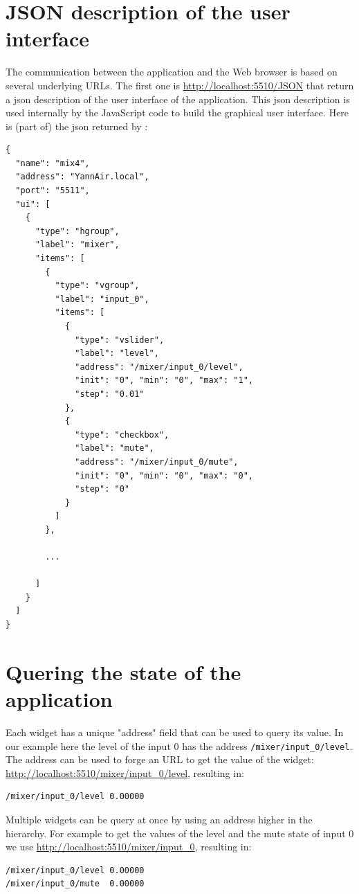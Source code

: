 \section{JSON description of the user interface}
The communication between the application and the Web browser is based on several underlying URLs. The first one is \url{http://localhost:5510/JSON} that return a json description of the user interface of the application. This json description is used internally by the JavaScript code to build the graphical user interface. Here is (part of) the json returned by :
\begin{lstlisting}
{
  "name": "mix4",
  "address": "YannAir.local",
  "port": "5511",
  "ui": [
    {
      "type": "hgroup",
      "label": "mixer",
      "items": [
        {
          "type": "vgroup",
          "label": "input_0",
          "items": [
            {
              "type": "vslider",
              "label": "level",
              "address": "/mixer/input_0/level",
              "init": "0", "min": "0", "max": "1", 
              "step": "0.01"
            },
            {
              "type": "checkbox",
              "label": "mute",
              "address": "/mixer/input_0/mute",
              "init": "0", "min": "0", "max": "0", 
              "step": "0"
            }
          ]
        },
        
        ...
        
      ]
    }
  ]
}
\end{lstlisting}

\section{Quering the state of the application}

Each widget has a unique "address" field that can be used to query its value. In our example here the level of the input 0 has the address \lstinline'/mixer/input_0/level'. The address can be used to forge an URL to get the value of the widget: \url{http://localhost:5510/mixer/input_0/level}, resulting in:
\begin{lstlisting}
/mixer/input_0/level 0.00000  
\end{lstlisting}

Multiple widgets can be query at once by using an address higher in the hierarchy. For example to get the values of the level and the mute state of input 0 we use \url{http://localhost:5510/mixer/input_0}, resulting in:
\begin{lstlisting}
/mixer/input_0/level 0.00000 
/mixer/input_0/mute  0.00000 
\end{lstlisting}

